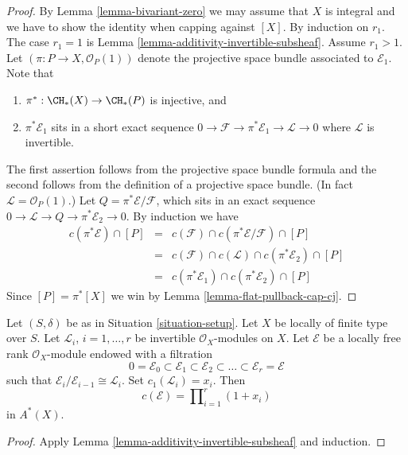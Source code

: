 \begin{proof}
By Lemma \ref{lemma-bivariant-zero} we may assume that $X$ is integral
and we have to show the identity when capping against $[X]$.
By induction on $r_1$. The case $r_1 = 1$ is
Lemma \ref{lemma-additivity-invertible-subsheaf}.
Assume $r_1 > 1$. Let $(\pi : P \to X, \mathcal{O}_P(1))$
denote the projective space bundle associated to $\mathcal{E}_1$. Note that
\begin{enumerate}
\item $\pi^* : \CH_*(X) \to \CH_*(P)$ is injective, and
\item $\pi^*\mathcal{E}_1$ sits in a short exact sequence
$0 \to \mathcal{F} \to \pi^*\mathcal{E}_1 \to \mathcal{L} \to 0$
where $\mathcal{L}$ is invertible.
\end{enumerate}
The first assertion follows from the projective space bundle formula
and the second follows from the definition of a projective space bundle.
(In fact $\mathcal{L} = \mathcal{O}_P(1)$.)
Let $Q = \pi^*\mathcal{E}/\mathcal{F}$, which sits in an
exact sequence $0 \to \mathcal{L} \to Q \to \pi^*\mathcal{E}_2 \to 0$.
By induction we have
\begin{eqnarray*}
c(\pi^*\mathcal{E}) \cap [P]
& = &
c(\mathcal{F}) \cap c(\pi^*\mathcal{E}/\mathcal{F}) \cap [P] \\
& = &
c(\mathcal{F}) \cap c(\mathcal{L}) \cap c(\pi^*\mathcal{E}_2) \cap [P] \\
& = &
c(\pi^*\mathcal{E}_1) \cap c(\pi^*\mathcal{E}_2) \cap [P]
\end{eqnarray*}
Since $[P] = \pi^*[X]$ we
win by Lemma \ref{lemma-flat-pullback-cap-cj}.
\end{proof}

\begin{lemma}
\label{lemma-chern-filter-by-linebundles}
Let $(S, \delta)$ be as in Situation \ref{situation-setup}.
Let $X$ be locally of finite type over $S$.
Let ${\mathcal L}_i$, $i = 1, \ldots, r$ be invertible
$\mathcal{O}_X$-modules on $X$.
Let $\mathcal{E}$ be a locally free rank
$\mathcal{O}_X$-module endowed with a filtration
$$
0 = \mathcal{E}_0 \subset \mathcal{E}_1 \subset \mathcal{E}_2
\subset \ldots \subset \mathcal{E}_r = \mathcal{E}
$$
such that $\mathcal{E}_i/\mathcal{E}_{i - 1} \cong \mathcal{L}_i$.
Set $c_1({\mathcal L}_i) = x_i$. Then
$$
c(\mathcal{E})
=
\prod\nolimits_{i = 1}^r (1 + x_i)
$$
in $A^*(X)$.
\end{lemma}

\begin{proof}
Apply Lemma \ref{lemma-additivity-invertible-subsheaf} and induction.
\end{proof}




